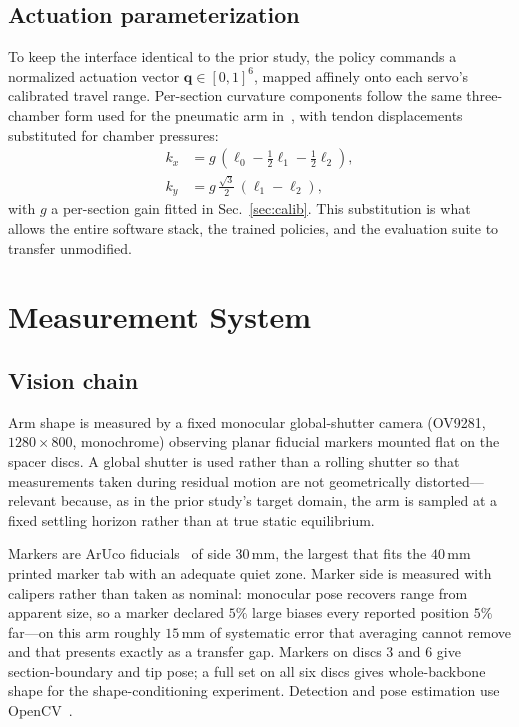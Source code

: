 \documentclass[letterpaper, 10pt, conference]{ieeeconf}
\begin{document}
\subsection{Actuation parameterization}

To keep the interface identical to the prior study, the policy commands a
normalized actuation vector $\mathbf{q}\in[0,1]^{6}$, mapped affinely onto
each servo's calibrated travel range. Per-section curvature components follow
the same three-chamber form used for the pneumatic arm
in~\cite{prior}, with tendon displacements substituted for chamber pressures:
\begin{align}
k_x &= g\,(\ell_0 - \tfrac{1}{2}\ell_1 - \tfrac{1}{2}\ell_2), \\
k_y &= g\,\tfrac{\sqrt{3}}{2}\,(\ell_1 - \ell_2),
\end{align}
with $g$ a per-section gain fitted in Sec.~\ref{sec:calib}. This substitution
is what allows the entire software stack, the trained policies, and the
evaluation suite to transfer unmodified.

\section{Measurement System}
\label{sec:sensing}

\subsection{Vision chain}

Arm shape is measured by a fixed monocular global-shutter camera
(OV9281, $1280\times800$, monochrome) observing planar fiducial markers
mounted flat on the spacer discs. A global shutter is used rather than a
rolling shutter so that measurements taken during residual motion are not
geometrically distorted---relevant because, as in the prior study's target
domain, the arm is sampled at a fixed settling horizon rather than at true
static equilibrium.

Markers are ArUco fiducials~\cite{garrido2014automatic} of side
$30\,$mm, the largest that fits the $40\,$mm printed marker tab with an
adequate quiet zone. Marker side is measured with calipers rather than taken
as nominal: monocular pose recovers range from apparent size, so a marker
declared $5\%$ large biases every reported position $5\%$ far---on this arm
roughly $15\,$mm of systematic error that averaging cannot remove and that
presents exactly as a transfer gap. Markers on discs 3 and 6 give section-boundary and tip
pose; a full set on all six discs gives whole-backbone shape for the
shape-conditioning experiment. Detection and pose estimation use
OpenCV~\cite{bradski2000opencv}.
\end{document}
